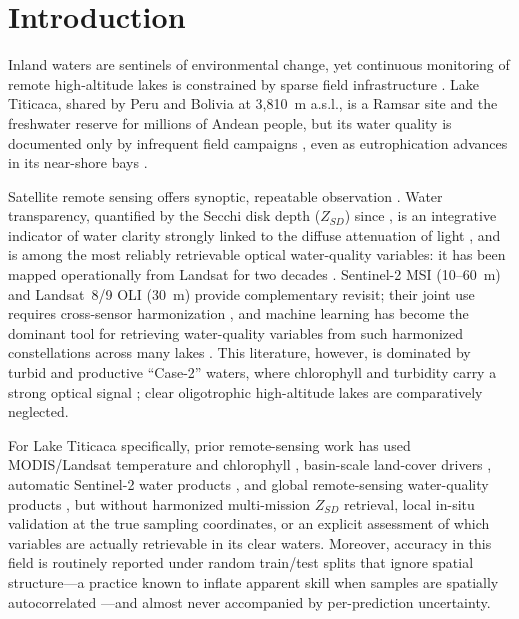 \documentclass[11pt]{article}
\begin{document}
\section{Introduction}
Inland waters are sentinels of environmental change, yet continuous monitoring of
remote high-altitude lakes is constrained by sparse field infrastructure
\citep{Williamson2009}. Lake Titicaca, shared by Peru and Bolivia at 3{,}810~m
a.s.l., is a Ramsar site and the freshwater reserve for millions of Andean people,
but its water quality is documented only by infrequent field campaigns
\citep{OEFA2016,Siguayro2022eval}, even as eutrophication advances in its
near-shore bays \citep{Heredia2022,Lanza2024}.

Satellite remote sensing offers synoptic, repeatable observation
\citep{Gholizadeh2016,Topp2020}. Water transparency, quantified by the Secchi disk
depth ($Z_{SD}$) since \citet{Tyler1968}, is an integrative indicator of water
clarity strongly linked to the diffuse attenuation of light \citep{Lee2015}, and is
among the most reliably retrievable optical water-quality variables: it has been
mapped operationally from Landsat for two decades
\citep{Kloiber2002,Olmanson2008,Zhang2022}. Sentinel-2 MSI (10--60~m) and Landsat~8/9 OLI
(30~m) provide complementary revisit; their joint use requires cross-sensor
harmonization \citep{Roy2016,Claverie2018,Pahlevan2019}, and machine learning has
become the dominant tool for retrieving water-quality variables from such
harmonized constellations across many lakes
\citep{Pahlevan2020,Cao2020,Cao2022,Arias2023,Pahlevan2022,Hafeez2019,Tian2023}.
This literature, however, is dominated by turbid and productive ``Case-2'' waters,
where chlorophyll and turbidity carry a strong optical signal
\citep{Gitelson2009,Mishra2012,Nechad2010,Dogliotti2015}; clear oligotrophic
high-altitude lakes are comparatively neglected.

For Lake Titicaca specifically, prior remote-sensing work has used MODIS/Landsat
temperature and chlorophyll \citep{RuizVerdu2016}, basin-scale land-cover drivers
\citep{Baltodano2022}, automatic Sentinel-2 water products \citep{AyalaIzurieta2023},
and global remote-sensing water-quality products \citep{Maligaya2024}, but without
harmonized multi-mission $Z_{SD}$ retrieval, local in-situ validation at the true
sampling coordinates, or an explicit assessment of which variables are actually
retrievable in its clear waters. Moreover, accuracy in this field is routinely
reported under random train/test splits that ignore spatial structure---a practice
known to inflate apparent skill when samples are spatially autocorrelated
\citep{Roberts2017,Ploton2020}---and almost never accompanied by per-prediction
uncertainty.
\end{document}
